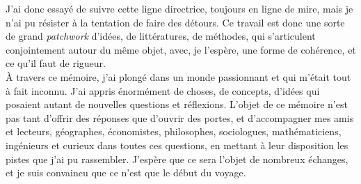J'ai donc essayé de suivre cette ligne directrice, toujours en ligne de mire, mais je n'ai pu résister à la tentation de faire des détours. Ce travail est donc une sorte de grand \emph{patchwork} d'idées, de littératures, de méthodes, qui s'articulent conjointement autour du même objet, avec, je l'espère, une forme de cohérence, et ce qu'il faut de rigueur.  \\

À travers ce mémoire, j'ai plongé dans un monde passionnant et qui m'était tout à fait inconnu. J'ai appris énormément de choses, de concepts, d'idées qui posaient autant de nouvelles questions et réflexions. L'objet de ce mémoire n'est pas tant d'offrir des réponses que d'ouvrir des portes, et d'accompagner mes amis et lecteurs, géographes, économistes, philosophes, sociologues, mathématiciens, ingénieurs et curieux dans toutes ces questions, en mettant à leur disposition les pistes que j'ai pu rassembler. J'espère que ce sera l'objet de nombreux échanges, et je suis convaincu que ce n'est que le début du voyage. 